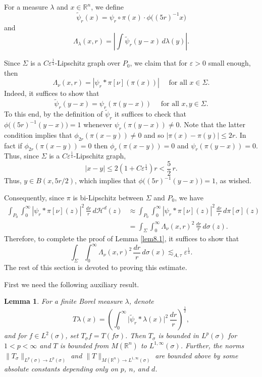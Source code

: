 \documentclass[11pt]{amsart}
\newcommand{\R}{{\mathbb R}}       %
\newcommand{\HH}{{\mathcal H}}
\newcommand{\dist}{{\rm dist}}
\newcommand{\ve}{{\varepsilon}}
\newcommand{\wt}[1]{{\widetilde{#1}}}
\newtheorem{lemma}[theorem]{Lemma}
\theoremstyle{definition}
\theoremstyle{remark}
\numberwithin{equation}{section}
\newcommand{\ps}[1]{\left( #1 \right)}
\newcommand{\av}[1]{\left| #1 \right|}
\def\lec{\lesssim}
\def\lec{\lesssim}
\begin{document}
For a measure $\lambda$ and $x\in \R^{n}$, we define
\[\wt{\psi}_{r}(x) = \psi_{r}\circ \pi(x) \cdot \phi\bigl((5r)^{-1}x\bigr)\]
and
\[
\Lambda_{\lambda}(x,r)
=\av{\int \wt{\psi}_{r}(y-x) \,d\lambda(y)}.\]

Since $\Sigma$ is a $C\ve^{\frac{1}{4}}$-Lipschitz graph over $P_{0}$, we claim that for $\ve>0$ small enough, then 
\begin{equation}\label{e:lambda-psi}
\Lambda_{\nu}(x,r) = |\psi_{r}* \pi[\nu](\pi(x))| \quad\mbox{ for all $x\in \Sigma$}.
\end{equation}
Indeed, it suffices to show that
\begin{equation}\label{eqpsi1}
\wt{\psi}_{r}(y-x) =\psi_{r}(\pi(y-x))
\quad\mbox{ for all $x,y\in\Sigma$.}
\end{equation}
To this end, by the definition of $\wt{\psi}_{r}$ it suffices to check that $\phi\bigl((5r)^{-1}(y-x)\bigr)
= 1$ whenever $\psi_{r}(\pi(y-x))\neq0$. Note that the latter condition implies that
 $\phi_{2r}(\pi(x-y))\neq0$ and so $|\pi(x)-\pi(y)|\leq 2r$. In fact if $\phi_{2r}(\pi(x-y))=0$ then $\phi_{r}(\pi(x-y))=0$ and $\psi_{r}(\pi(y-x))=0$. Thus, since $\Sigma$ is a $C\ve^{\frac{1}{4}}$-Lipschitz graph, 
\[
|x-y|\leq 2(1+C\ve^{\frac{1}{4}})r<\frac{5}{2}\,r.\] 
Thus, $y\in B(x,5r/2)$, which implies that $
\phi\bigl((5r)^{-1}(y-x)\bigr)=1$, as wished.

Consequently, since $\pi$ is bi-Lipschitz between $\Sigma$ and $P_{0}$, we have
\begin{align*}
\int_{P_0}  \int_{0}^{\infty} |\psi_{r}*\pi[\nu](z)|^{2} \,\frac{dr}{r}\, d\HH^d(z) &\approx
\int_{P_0}  \int_{0}^{\infty} |\psi_{r}*\pi[\nu](z)|^{2} \,\frac{dr}{r}\, d\pi[\sigma](z)\\
&=\int_{\Sigma}  \int_{0}^{\infty} \Lambda_{\nu}(x,r)^{2} \,\frac{dr}{r}\, d\sigma(z).
\end{align*}
Therefore, to complete the proof of Lemma \ref{lem8.1}, it suffices to show that
\begin{equation}
\label{e:lambda-int}
\int_{\Sigma}  \int_{0}^{\infty} \Lambda_{\nu}(x,r)^{2}\, \frac{dr}{r} \,d\sigma(x) \lec_{A,\tau} \ve^{\frac{1}{4}}.
\end{equation}
The rest of this section is devoted to proving this estimate. 

First we need the following auxiliary result.

\begin{lemma} 
	\label{l:tt-lemma}
	For a finite Borel measure $\lambda$, denote 
\[
	T\lambda(x) = \ps{\int_{0}^{\infty} \bigl|\wt\psi_{r}*\lambda(x)\bigr|^{2}
	 \,\frac{dr}{r}}^{\frac{1}{2}},
	\]
and for $f\in L^2(\sigma)$,
	set $T_\sigma f=T(f\sigma)$. Then $T_\sigma$ is bounded in $L^p(\sigma)$ for $1<p<\infty$  and $T$ is bounded from 
$M(\R^{n})$ to $L^{1,\infty}(\sigma)$. Further, the norms $\|T_\sigma\|_{L^p(\sigma)\to L^p(\sigma)}$ and
 $\|T\|_{M(\R^n)\to L^{1,\infty}(\sigma)}$ are bounded above by some absolute constants depending only on $p$, $n$, and $d$.
\end{lemma}
\end{document}
